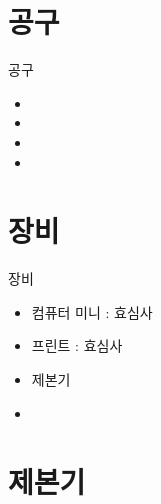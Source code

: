 \documentclass[aspectratio=1610,17pt,xcolor=pdftex,dvipsnames,table,handout]{beamer}
\begin{document}
		\section{ 공구  }
		\frame [plain] {\sectionpage}

		\begin{frame} [t,plain]
			\begin{block} { 공구 }
			\begin{itemize}
				\item 
				\item 
				\item 
				\item 
			\end{itemize}
			
			\end{block}
		\end{frame}
	

		\section{ 장비 }
		\frame [plain] {\sectionpage}

		\begin{frame} [t,plain]
			\begin{block} { 장비 }
			\begin{itemize}
				\item 컴퓨터 미니 : 효심사
				\item 프린트 : 효심사
				\item 제본기 
				\item 
			\end{itemize}
			
			\end{block}
		\end{frame}
	

		\section{ 제본기 }
		\frame [plain] {\sectionpage}
\end{document}

